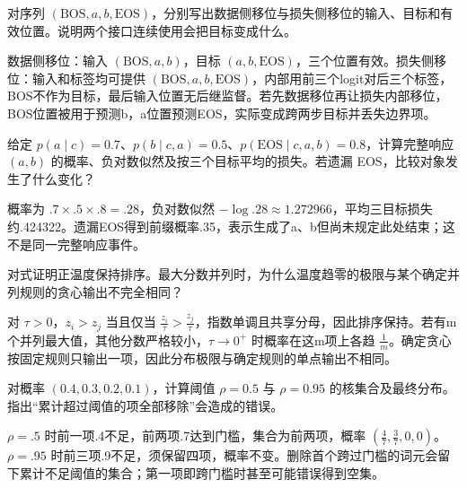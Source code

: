 
\begin{exercises}
\begin{exercise} 对序列 $(\mathrm{BOS},a,b,\mathrm{EOS})$，分别写出数据侧移位与损失侧移位的输入、目标和有效位置。说明两个接口连续使用会把目标变成什么。

\begin{solution}
数据侧移位：输入 $(\mathrm{BOS},a,b)$，目标 $(a,b,\mathrm{EOS})$，三个位置有效。损失侧移位：输入和标签均可提供 $(\mathrm{BOS},a,b,\mathrm{EOS})$，内部用前三个logit对后三个标签，BOS不作为目标，最后输入位置无后继监督。若先数据移位再让损失内部移位，BOS位置被用于预测b，a位置预测EOS，实际变成跨两步目标并丢失边界项。
\end{solution}
\end{exercise}

\begin{exercise} 给定 $p(a\mid c)=0.7$、$p(b\mid c,a)=0.5$、$p(\mathrm{EOS}\mid c,a,b)=0.8$，计算完整响应 $(a,b)$ 的概率、负对数似然及按三个目标平均的损失。若遗漏 EOS，比较对象发生了什么变化？

\begin{solution}
概率为 $.7\times.5\times.8=.28$，负对数似然 $-\log.28\approx1.272966$，平均三目标损失约.424322。遗漏EOS得到前缀概率.35，表示生成了a、b但尚未规定此处结束；这不是同一完整响应事件。
\end{solution}
\end{exercise}

\begin{exercise} 对式证明正温度保持排序。最大分数并列时，为什么温度趋零的极限与某个确定并列规则的贪心输出不完全相同？

\begin{solution}
对 $\tau>0$，$z_i>z_j$ 当且仅当 $\frac{z_i}{\tau}>\frac{z_j}{\tau}$，指数单调且共享分母，因此排序保持。若有m个并列最大值，其他分数严格较小，$\tau\to0^+$ 时概率在这m项上各趋 $\frac{1}{m}$。确定贪心按固定规则只输出一项，因此分布极限与确定规则的单点输出不相同。
\end{solution}
\end{exercise}

\begin{exercise} 对概率 $(0.4,0.3,0.2,0.1)$，计算阈值 $\rho=0.5$ 与 $\rho=0.95$ 的核集合及最终分布。指出“累计超过阈值的项全部移除”会造成的错误。

\begin{solution}
$\rho=.5$ 时前一项.4不足，前两项.7达到门槛，集合为前两项，概率 $(\frac{4}{7},\frac{3}{7},0,0)$。$\rho=.95$ 时前三项.9不足，须保留四项，概率不变。删除首个跨过门槛的词元会留下累计不足阈值的集合；第一项即跨门槛时甚至可能错误得到空集。
\end{solution}
\end{exercise}


\end{exercises}
